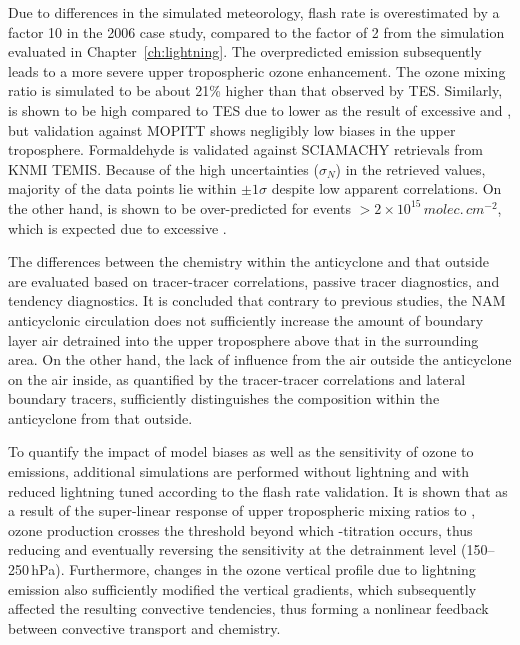 Due to differences in the simulated meteorology, flash rate is overestimated by a factor 10 in the
2006 case study, compared to the factor of 2 from the simulation evaluated in  Chapter~\ref{ch:lightning}.
The overpredicted {\lnox} emission subsequently leads to a more severe upper tropospheric
ozone enhancement. The ozone mixing ratio is simulated to be about 21\% higher than that
observed by TES. Similarly,  is shown to be high compared to TES due to lower
 as the result of excessive  and , but validation
against MOPITT shows negligibly low biases in the upper troposphere. Formaldehyde is validated against SCIAMACHY retrievals
from KNMI TEMIS. Because of the high uncertainties ($\sigma_N$) in the retrieved values,
majority of the data points lie within $\pm1\sigma$ despite low apparent correlations. On the
other hand,  is shown to be over-predicted for events $>2\times10^{15}\,\unit{molec.\,cm^{-2}}$,
which is expected due to excessive {\lnox}.

The differences between the chemistry within the anticyclone and that outside are evaluated
based on tracer-tracer correlations, passive tracer diagnostics, and tendency diagnostics. It
is concluded that contrary to previous studies, the NAM anticyclonic circulation does not
sufficiently increase the amount of boundary layer air detrained into the upper troposphere above
that in the surrounding area. On the other hand, the lack of influence from the air outside the anticyclone on the air inside, as quantified
by the tracer-tracer correlations and lateral boundary tracers, sufficiently distinguishes the
composition within the anticyclone from that outside.

To quantify the impact of model biases as well as the sensitivity of ozone to {\lnox} emissions,
additional simulations are performed without lightning and with reduced lightning tuned according
to the flash rate validation. It is shown that as a result of the super-linear response of upper
tropospheric  mixing ratios to {\lnox}, ozone production crosses the threshold
beyond which -titration occurs, thus reducing and eventually reversing the
sensitivity at the detrainment level (150--250\,\unit{hPa}). Furthermore, changes in the ozone
vertical profile due to lightning emission also sufficiently modified the vertical gradients, which
subsequently affected the resulting convective tendencies, thus forming a nonlinear feedback
between convective transport and chemistry.

